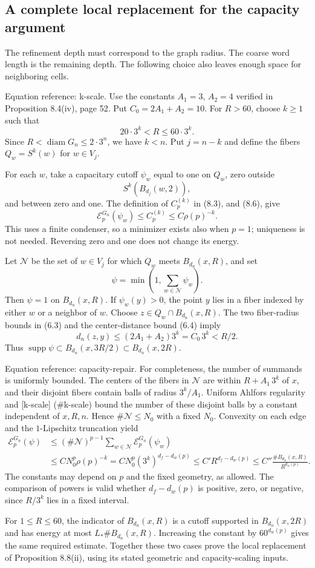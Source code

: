 \documentclass[10pt]{article}
\begin{document}
\subsection*{A complete local replacement for the capacity argument}
The refinement depth must correspond to the graph radius. The coarse word length is the remaining depth. The following choice also leaves enough space for neighboring cells.\par
Equation reference: k-scale. Use the constants \(A_1=3\), \(A_2=4\) verified in Proposition 8.4(iv), page 52. Put \(C_0=2A_1+A_2=10\). For \(R>60\), choose \(k\ge1\) such that \[
 20\cdot3^k<R\le60\cdot3^k.\] Since \(R<\operatorname{diam}G_n\le2\cdot3^n\), we have \(k<n\). Put \(j=n-k\) and define the fibers \(Q_w=S^k(w)\) for \(w\in V_j\).\par
For each \(w\), take a capacitary cutoff \(\psi_w\) equal to one on \(Q_w\), zero outside \[S^k(B_{d_j}(w,2)),\] and between zero and one. The definition of \(C_p^{(k)}\) in (8.3), and (8.6), give \[\mathcal E_p^{G_n}(\psi_w)\le C_p^{(k)}
 \le C\rho(p)^{-k}.\] This uses a finite condenser, so a minimizer exists also when \(p=1\); uniqueness is not needed. Reversing zero and one does not change its energy.\par
Let \(\mathcal N\) be the set of \(w\in V_j\) for which \(Q_w\) meets \(B_{d_n}(x,R)\), and set \[\psi=\min\left(1,\sum_{w\in\mathcal N}\psi_w\right).\] Then \(\psi=1\) on \(B_{d_n}(x,R)\). If \(\psi_w(y)>0\), the point \(y\) lies in a fiber indexed by either \(w\) or a neighbor of \(w\). Choose \(z\in Q_w\cap B_{d_n}(x,R)\). The two fiber-radius bounds in (6.3) and the center-distance bound (6.4) imply \[d_n(z,y)\le(2A_1+A_2)3^k=C_0\,3^k<R/2.\] Thus \(\operatorname{supp}\psi\subset B_{d_n}(x,3R/2)\subset B_{d_n}(x,2R)\).\par
Equation reference: capacity-repair. For completeness, the number of summands is uniformly bounded. The centers of the fibers in \(\mathcal N\) are within \(R+A_1\,3^k\) of \(x\), and their disjoint fibers contain balls of radius \(3^k/A_1\). Uniform Ahlfors regularity and [k-scale] (\#k-scale) bound the number of these disjoint balls by a constant independent of \(x,R,n\). Hence \(\#\mathcal N\le N_0\) with a fixed \(N_0\). Convexity on each edge and the \(1\)-Lipschitz truncation yield \[\begin{aligned}
 \mathcal E_p^{G_n}(\psi)
 &\le(\#\mathcal N)^{p-1}\sum_{w\in\mathcal N}
           \mathcal E_p^{G_n}(\psi_w)\\
 &\le C N_0^p\rho(p)^{-k}
 =C N_0^p(3^k)^{d_f-d_w(p)}
 \le C' R^{d_f-d_w(p)}
 \le C''\frac{\#B_{d_n}(x,R)}{R^{d_w(p)}}. \end{aligned}\] The constants may depend on \(p\) and the fixed geometry, as allowed. The comparison of powers is valid whether \(d_f-d_w(p)\) is positive, zero, or negative, since \(R/3^k\) lies in a fixed interval.\par
For \(1\le R\le60\), the indicator of \(B_{d_n}(x,R)\) is a cutoff supported in \(B_{d_n}(x,2R)\) and has energy at most \(L_*\#B_{d_n}(x,R)\). Increasing the constant by \(60^{d_w(p)}\) gives the same required estimate. Together these two cases prove the local replacement of Proposition 8.8(ii), using its stated geometric and capacity-scaling inputs.\par
\end{document}
